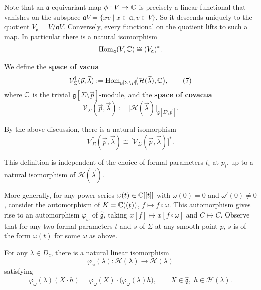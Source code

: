 \documentclass[12pt]{article}
\begin{document}
Note that an $\mathfrak{a}$-equivariant map $\phi:V\to \mathbb{C}$ is precisely a linear functional that vanishes on the subspace $\mathfrak{a}V = \{xv\mid x\in\mathfrak{a}, v\in V\}$. So it descends uniquely to the quotient $V_{\mathfrak{a}}=V/\mathfrak{a}V$. Conversely, every functional on the quotient lifts to such a map. In particular there is a natural isomorphism
\begin{align*}
    \operatorname{Hom}_{\mathfrak{a}}(V,\mathbb{C})
    \cong (V_{\mathfrak{a}})^*.
\end{align*}
\begin{definition}
    We define the \textbf{space of vacua}
    \begin{equation}
        \mathcal{V}^{\dagger}_{\Sigma}(\vec{p},\vec{\lambda})
        := \operatorname{Hom}_{\mathfrak{g}[\Sigma\setminus\vec{p}]}
        \!\bigl(\mathcal{H}(\vec{\lambda}),\mathbb{C}\bigr),
        \tag{7}
    \end{equation} where $\mathbb{C}$ is the trivial $\mathfrak{g}[\Sigma\setminus\vec{p}]$-module, and the \textbf{space of covacua}
    \begin{equation}
        \mathcal{V}_{\Sigma}(\vec{p},\vec{\lambda})
        := \bigl[\mathcal{H}(\vec{\lambda})\bigr]_{\mathfrak{g}[\Sigma\setminus\vec{p}]}.
        \tag{8}
    \end{equation}
\end{definition}
By the above discussion, there is a natural isomorphism
\begin{equation}
    \mathcal{V}^{\dagger}_{\Sigma}(\vec{p},\vec{\lambda})
    \cong \bigl[\mathcal{V}_{\Sigma}(\vec{p},\vec{\lambda})\bigr]^*.
    \tag{9}
\end{equation}

This definition is independent of the choice of formal parameters $t_i$ at $p_i$, up to a natural isomorphism of $\mathcal{H}(\vec{\lambda})$.

More generally, for any power series $\omega(t) \in \mathbb{C}[[t]]$ with $\omega(0)=0$ and $\omega'(0)\ne 0$, consider
the automorphism of $K = \mathbb{C}((t))$, $f \mapsto f \circ \omega$.
This automorphism gives rise to an automorphism $\varphi_\omega$ of $\widehat{\mathfrak g}$,
taking $x[f] \mapsto x[f \circ \omega]$ and $C \mapsto C$.
Observe that for any two formal parameters $t$ and $s$ of $\Sigma$ at any smooth point $p$,
$s$ is of the form $\omega(t)$ for some $\omega$ as above.

\begin{lemma}[Lemma~2.1.2]
    For any $\lambda \in D_c$, there is a natural linear isomorphism
    \[
        \varphi_\omega(\lambda)\colon
        \mathcal H(\lambda) \longrightarrow \mathcal H(\lambda)
    \]
    satisfying
    \[
        \varphi_\omega(\lambda)(X\cdot h)
        = \varphi_\omega(X)\cdot \bigl(\varphi_\omega(\lambda)h\bigr),
        \qquad X\in \widehat{\mathfrak g},\; h\in \mathcal H(\lambda).
    \]
\end{lemma}
\end{document}
